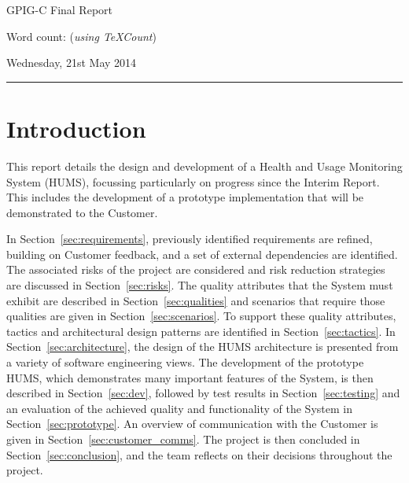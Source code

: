 \documentclass[10pt,a4paper]{article}
\begin{document}
\begin{center}
{\vspace*{-0.5cm}
\Huge GPIG-C Final Report}
\vspace*{0.2cm}

Word count:  (\textit{using TeXCount})
\vspace*{0.1cm}

Wednesday, 21st May 2014
\end{center}
\vspace*{0.4cm}
\hrule
\vspace*{0.4cm}

\section{Introduction}
\label{sec:intro}

This report details the design and development of a Health and Usage Monitoring System (HUMS), focussing particularly on progress since the Interim Report. This includes the development of a prototype implementation that will be demonstrated to the Customer.

In Section~\ref{sec:requirements}, previously identified requirements are refined, building on Customer feedback, and a set of external dependencies are identified. The associated risks of the project are considered and risk reduction strategies are discussed in Section~\ref{sec:risks}. The quality attributes that the System must exhibit are described in Section~\ref{sec:qualities} and scenarios that require those qualities are given in Section~\ref{sec:scenarios}. To support these quality attributes, tactics and architectural design patterns are identified in Section~\ref{sec:tactics}. In Section~\ref{sec:architecture}, the design of the HUMS architecture is presented from a variety of software engineering views. The development of the prototype HUMS, which demonstrates many important features of the System, is then described in Section~\ref{sec:dev}, followed by test results in Section~\ref{sec:testing} and an evaluation of the achieved quality and functionality of the System in Section~\ref{sec:prototype}. An overview of communication with the Customer is given in Section~\ref{sec:customer_comms}. The project is then concluded in Section~\ref{sec:conclusion}, and the team reflects on their decisions throughout the project.
\end{document}
